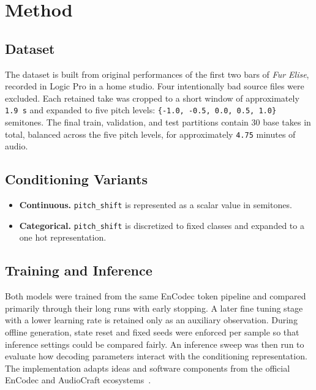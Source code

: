 \documentclass{article}
\begin{document}
\section{Method}\label{sec:method}

\subsection{Dataset}\label{subsec:dataset}

The dataset is built from original performances of the first two bars of \textit{Fur Elise}, recorded in Logic Pro in a home studio. Four intentionally bad source files were excluded. Each retained take was cropped to a short window of approximately \texttt{1.9\,s} and expanded to five pitch levels: \texttt{\{-1.0, -0.5, 0.0, 0.5, 1.0\}} semitones. The final train, validation, and test partitions contain 30 base takes in total, balanced across the five pitch levels, for approximately \texttt{4.75} minutes of audio.

\subsection{Conditioning Variants}\label{subsec:conditioning_variants}

\begin{itemize}[leftmargin=*]
  \item \textbf{Continuous.} \texttt{pitch\_shift} is represented as a scalar value in semitones.
  \item \textbf{Categorical.} \texttt{pitch\_shift} is discretized to fixed classes and expanded to a one hot representation.
\end{itemize}

\subsection{Training and Inference}\label{subsec:training_and_inference}

Both models were trained from the same EnCodec token pipeline and compared primarily through their long runs with early stopping. A later fine tuning stage with a lower learning rate is retained only as an auxiliary observation. During offline generation, state reset and fixed seeds were enforced per sample so that inference settings could be compared fairly. An inference sweep was then run to evaluate how decoding parameters interact with the conditioning representation. The implementation adapts ideas and software components from the official EnCodec and AudioCraft ecosystems~\cite{facebookresearch2022encodec,facebookresearch2023audiocraft}.
\end{document}
